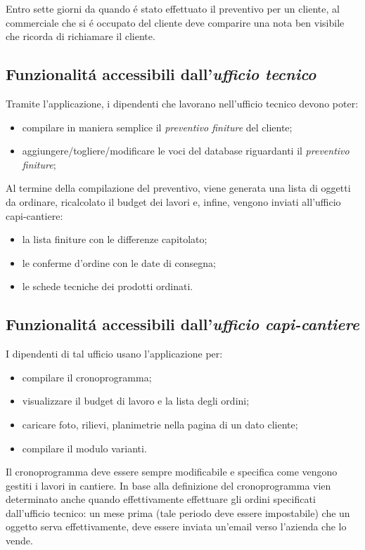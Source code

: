 \documentclass[paper=a4, fontsize=11pt]{scrartcl} %
\numberwithin{equation}{section} %
\numberwithin{figure}{section} %
\numberwithin{table}{section} %
\begin{document}
Entro sette giorni da quando \'e stato effettuato il preventivo per un cliente,
al commerciale che si \'e occupato del cliente deve comparire una nota ben
visibile che ricorda di richiamare il cliente.



\subsection{Funzionalit\'a accessibili dall'\textit{ufficio tecnico}}

Tramite l'applicazione, i dipendenti che lavorano nell'ufficio tecnico
devono poter:
\begin{itemize}
\item compilare in maniera semplice il \textit{preventivo finiture} del cliente;
\item aggiungere/togliere/modificare le voci del database riguardanti il \textit{preventivo finiture};
\end{itemize}

Al termine della compilazione del preventivo, viene generata una lista di oggetti da
ordinare, ricalcolato il budget dei lavori e, infine, vengono inviati all'ufficio capi-cantiere:
\begin{itemize}
\item la lista finiture con le differenze capitolato;
\item le conferme d'ordine con le date di consegna;
\item le schede tecniche dei prodotti ordinati.
\end{itemize}

\subsection{Funzionalit\'a accessibili dall'\textit{ufficio capi-cantiere}}

I dipendenti di tal ufficio usano l'applicazione per:
\begin{itemize}
\item compilare il cronoprogramma;
\item visualizzare il budget di lavoro e la lista degli ordini;
\item caricare foto, rilievi, planimetrie nella pagina di un dato cliente;
\item compilare il modulo varianti.
\end{itemize}

Il cronoprogramma deve essere sempre modificabile e specifica come vengono
gestiti i lavori in cantiere.
In base alla definizione del cronoprogramma vien determinato anche quando effettivamente
effettuare gli ordini specificati dall'ufficio tecnico: un mese prima (tale periodo
deve essere impostabile) che un oggetto serva effettivamente, deve essere inviata
un'email verso l'azienda che lo vende.
\end{document}
